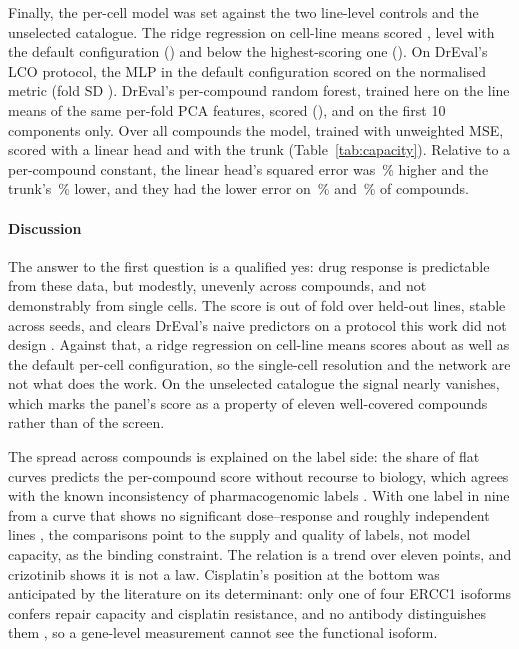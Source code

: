 Finally, the per-cell model was set against the two line-level controls and the unselected catalogue.
The ridge regression on cell-line means scored \RidgePca{}, level with the default configuration
(\SwPcaMaeZero{}) and below the highest-scoring one (\SpBest{}). On DrEval's LCO protocol, the MLP in
the default configuration scored \DrMlpNorm{} on the normalised metric (fold SD
\DrMlpSd{}). DrEval's per-compound random forest, trained here on the line means of the same per-fold PCA
features, scored \DrRfPcaNorm{} (\DrRfPcaSd{}), and \DrRfPcaTen{} on the first 10 components only. Over all \NDrugsModelled{} compounds the model, trained with unweighted MSE, scored \SpAllDrugs{} with a
linear head and \HdAllTrunkPca{} with the trunk (Table~\ref{tab:capacity}). Relative to a per-compound
constant, the linear head's squared error was \HdRiseLinPca\,\% higher and the trunk's
\HdGainTrunkPca\,\% lower, and they had the lower error on \HdBeatLinPca\,\% and \HdBeatTrunkPca\,\%
of compounds.


\paragraph{Discussion} The answer to the first question is a qualified yes: drug response is
predictable from these data, but modestly, unevenly across compounds, and not demonstrably from single
cells. The score is out of fold over held-out
lines, stable across seeds, and clears DrEval's naive predictors on a protocol this work did not design
\cite{dreval}. Against that, a ridge regression on cell-line means scores about as well as the
default per-cell configuration, so
the single-cell resolution and the network are not what does the work. On the unselected catalogue the signal nearly vanishes, which marks the
panel's score as a property of eleven well-covered compounds rather than of the screen.

The spread across compounds is explained on the label side: the share
of flat curves predicts the per-compound score without recourse to biology, which agrees with the known
inconsistency of pharmacogenomic labels \cite{haibekains2013,safikhani2017,bayer2023curvecurator}. With one label in nine
from a curve that shows no significant dose--response and roughly \NLinesCV{} independent lines \cite{lazic2010,dreval}, the comparisons point to the
supply and quality of labels, not model capacity, as the binding constraint. The relation is a trend over eleven points,
and crizotinib shows it is not a law. Cisplatin's position at the bottom was anticipated by the
literature on its determinant: only one of four ERCC1 isoforms confers repair
capacity and cisplatin resistance, and no antibody distinguishes them \cite{friboulet_ercc1}, so a
gene-level measurement cannot see the functional isoform.

